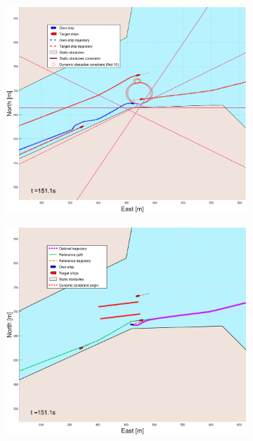 \begin{figure}[!ht]
\begin{subfigure}[b]{0.499\textwidth}
    \end{subfigure}
    \hfill
    \\
    \begin{subfigure}[b]{0.49\textwidth}
        \centering
        \includegraphics[width=\textwidth]{Images/Figures/Trheimfjord/_Simple_1fig1_time=151}
    \end{subfigure}
    \hfill
    \begin{subfigure}[b]{0.499\textwidth}
        \centering
        \includegraphics[width=\textwidth]{Images/Figures/Trheimfjord/_Simple_1fig999_time=151}
    \end{subfigure}
    \hfill
\end{figure}%
